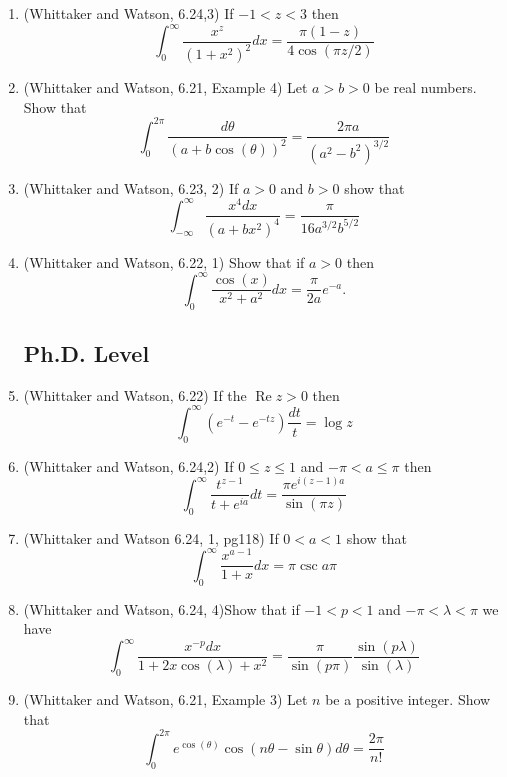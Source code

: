 \documentclass[a4paper,10pt]{article}
\title{}
\author{Dupuy --- Complex Analysis --- Spring 2017 --- Homework 04}
\date{}
\renewcommand{\Re}{\operatorname{Re}}
\begin{document}
\maketitle



\begin{enumerate}
\subsection*{Master's Level}

\item (Whittaker and Watson, 6.24,3)
 If $-1 < z < 3$ then 
  $$ \int_0^{\infty} \frac{x^z}{(1+x^2)^2}dx = \frac{\pi (1-z) }{4 \cos( \pi z/2) }$$

\item (Whittaker and Watson, 6.21, Example 4)
Let $a>b>0$ be real numbers. 
Show that 
 $$ \int_0^{2\pi} \frac{d\theta}{(a+b\cos(\theta))^2} = \frac{2\pi a}{(a^2-b^2)^{3/2}}$$


\item (Whittaker and Watson, 6.23, 2) If $a>0$ and $b>0$ show that 
 $$ \int_{-\infty}^{\infty} \frac{x^4dx}{(a+bx^2)^4} = \frac{\pi}{16 a^{3/2}b^{5/2}}$$
 
\item (Whittaker and Watson, 6.22, 1) Show that if $a>0$ then 
 $$ \int_0^{\infty} \frac{\cos(x)}{x^2+a^2}dx = \frac{\pi}{2a}e^{-a}. $$


\subsection*{Ph.D. Level}

\item (Whittaker and Watson, 6.22)
If the $\Re z >0$ then 
 $$ \int_0^{\infty} (e^{-t} - e^{-tz}) \frac{dt}{t} = \log z $$
 
\item (Whittaker and Watson, 6.24,2) If $0 \leq z \leq 1$ and $-\pi< a \leq \pi$ then
$$\int_0^{\infty} \frac{t^{z-1}}{t + e^{ia} }dt  = \frac{\pi e^{i(z-1)a}}{\sin(\pi z)} $$


\item (Whittaker and Watson 6.24, 1, pg118)
If $0<a<1$ show that 
 $$ \int_0^{\infty} \frac{x^{a-1}}{1+x}dx = \pi \csc a \pi $$


\item (Whittaker and Watson, 6.24, 4)Show that if $-1<p<1$ and $-\pi<\lambda<\pi$ we have 
 $$ \int_0^{\infty} \frac{x^{-p} dx}{1 + 2x \cos(\lambda) + x^2 } = \frac{\pi}{\sin(p\pi)} \frac{\sin(p\lambda)}{\sin(\lambda)}$$

\item  (Whittaker and Watson, 6.21, Example 3)
Let $n$ be a positive integer. 
Show that 
 $$ \int_0^{2\pi} e^{\cos(\theta)} \cos(n\theta - \sin\theta)d\theta = \frac{2\pi}{n!}$$


\end{enumerate}
\end{document}
